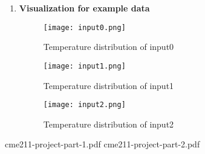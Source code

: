 \documentclass{article}
\begin{document}
\begin{enumerate}
\item \textbf{Visualization for example data}
\begin{figure}
\centering
\texttt{[image: input0.png]}
\caption{Temperature distribution of input0}
\end{figure}

\begin{figure}
\centering
\texttt{[image: input1.png]}
\caption{Temperature distribution of input1}
\end{figure}

\begin{figure}
\centering
\texttt{[image: input2.png]}
\caption{Temperature distribution of input2}
\end{figure}

\end{enumerate}

\newpage
\begin{thebibliography}{99}
 cme211-project-part-1.pdf
 cme211-project-part-2.pdf
\end{thebibliography}
\end{document}
